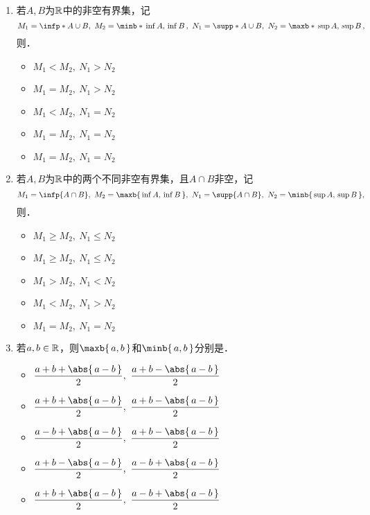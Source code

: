 \begin{enumerate}
\item 若\(A, B\)为\(\mathbb{R}\)中的非空有界集，记
  \begin{equation*}
    M_1 = \infp*{A \cup B},\ M_2 = \minb*{\,\inf A,\, \inf B\,},\ N_1 = \supp*{A \cup B},\ N_2 = \maxb*{\,\sup A,\, \sup B\,},
  \end{equation*}
  则\uline{\hspace{8em}}．
  \begin{itemize}
    \renewcommand{\labelitemi}{\faCircleThin}
  \item \(M_1 < M_2,\ N_1 > N_2\)
  \item \(M_1 = M_2,\ N_1 > N_2\)
  \item \(M_1 < M_2,\ N_1 = N_2\)
    \ifshowsol
    \item[\faCircle] \(M_1 = M_2,\ N_1 = N_2\)
    \else
    \item \(M_1 = M_2,\ N_1 = N_2\)
    \fi
  \end{itemize}

\item 若\(A, B\)为\(\mathbb{R}\)中的两个不同非空有界集，且\(A \cap B\)非空，记
  \begin{equation*}
    M_1 = \infp{A \cap B},\ M_2 = \maxb{\,\inf A,\, \inf B\,},\ N_1 = \supp{A \cap B},\ N_2 = \minb{\,\sup A,\, \sup B\,},
  \end{equation*}
  则\uline{\hspace{8em}}．
  \begin{itemize}
    \renewcommand{\labelitemi}{\faCircleThin}
    \ifshowsol
    \item[\faCircle] \(M_1 \ge M_2,\ N_1 \le N_2\)
    \else
    \item \(M_1 \ge M_2,\ N_1 \le N_2\)
    \fi
  \item \(M_1 > M_2,\ N_1 < N_2\)
  \item \(M_1 < M_2,\ N_1 > N_2\)
  \item \(M_1 = M_2,\ N_1 = N_2\)
  \end{itemize}

\item \label{B1.1.1.E9}若\(a, b \in \mathbb{R}\)，则\(\maxb{\,a, b\,}\)和\(\minb{\,a, b\,}\)分别是\uline{\makebox[4em]{}}．
  \begin{itemize}
    \renewcommand{\labelitemi}{\faCircleThin}
    \ifshowsol
    \item[\faCircle] \(\displaystyle \frac{a+b+\abs{\,a-b\,}}{2},\ \frac{a+b-\abs{\,a-b\,}}{2}\)
    \else
    \item \(\displaystyle \frac{a+b+\abs{\,a-b\,}}{2},\ \frac{a+b-\abs{\,a-b\,}}{2}\)
    \fi
  \item \(\displaystyle \frac{a-b+\abs{\,a-b\,}}{2},\ \frac{a+b-\abs{\,a-b\,}}{2}\)
  \item \(\displaystyle \frac{a+b-\abs{\,a-b\,}}{2},\ \frac{a-b+\abs{\,a-b\,}}{2}\)
  \item \(\displaystyle \frac{a+b+\abs{\,a-b\,}}{2},\ \frac{a-b+\abs{\,a-b\,}}{2}\)
  \end{itemize}


\end{enumerate}

